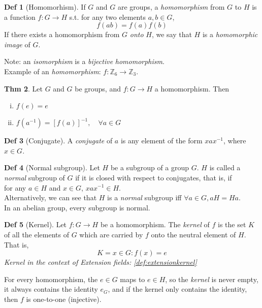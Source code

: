 \documentclass{article}
\theoremstyle{definition}
\newtheorem{definition}{Def}[section]
\newtheorem{theorem}[definition]{Thm}
\begin{document}
\begin{definition}[Homomorhism]
    If $G$ and $G$ are groups, a \emph{homomorphism} from $G$ to $H$ is a function $f: G \rightarrow H$ s.t. for any two elements $a, b \in G$,
    $$f(ab) = f(a)f(b)$$
    If there exists a homomorphism from $G$ \emph{onto} $H$, we say that $H$ is a \emph{homomorphic image} of $G$.
\end{definition}
Note: an \emph{isomorphism} is a \emph{bijective} \emph{homomorphism}.
\\
Example of an \emph{homomorphism}: $f: \mathbb{Z}_6 \rightarrow \mathbb{Z}_3$.


\begin{theorem}
    Let $G$ and $G$ be groups, and $f: G \rightarrow H$ a homomorphism. Then
    \begin{enumerate}[i.]
	\item $f(e) = e$
	\item $f(a^{-1}) = [f(a)]^{-1}, \quad \forall a \in G$
    \end{enumerate}
\end{theorem}

\begin{definition}[Conjugate]
    A \emph{conjugate} of $a$ is any element of the form $xax^{-1}$, where $x \in G$.
\end{definition}

\begin{definition}[Normal subgroup]
    Let $H$ be a subgroup of a group $G$. $H$ is called a \emph{normal} subgroup of $G$ if it is closed with respect to conjugates, that is, if\\
    for any $a \in H$ and $x \in G$, $xax^{-1} \in H$.
    \\
    Alternatively, we can see that $H$ is a \emph{normal} subgroup iff $\forall a \in G, aH = Ha$.
    \\
    In an abelian group, every subgroup is normal.
\end{definition}

\begin{definition}[Kernel]\label{def:homomorphismkernel}
    Let $f: G \rightarrow H$ be a homomorphism. The \emph{kernel} of $f$ is the set $K$ of all the elements of $G$ which are carried by $f$ onto the neutral element of $H$. That is,
    $$K = {x \in G : f(x) = e}$$
    \emph{Kernel in the context of Extension fields: \ref{def:extensionkernel}}
\end{definition}
For every homomorphism, the $e \in G$ maps to $e \in H$, so the \emph{kernel} is never empty, it always contains the identity $e_G$, and if the kernel only contains the identity, then $f$ is one-to-one (injective).
\end{document}
